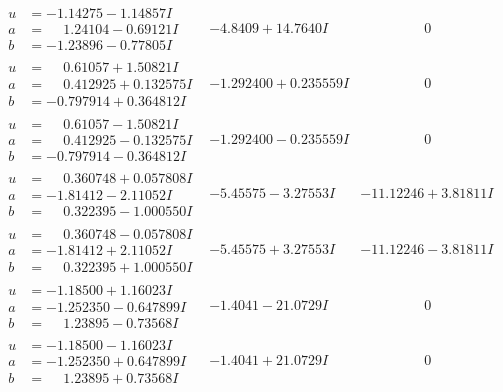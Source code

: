 \documentclass[1p]{elsarticle_modified}
\theoremstyle{definition}
\begin{document}
$$\begin{array}{c|c|c}
\begin{aligned}
u &= -1.14275 - 1.14857 I \\
a &= \phantom{-}1.24104 - 0.69121 I \\
b &= -1.23896 - 0.77805 I\end{aligned}
 & -4.8409 + 14.7640 I & \phantom{-0.000000 } 0 \\ \hline\begin{aligned}
u &= \phantom{-}0.61057 + 1.50821 I \\
a &= \phantom{-}0.412925 + 0.132575 I \\
b &= -0.797914 + 0.364812 I\end{aligned}
 & -1.292400 + 0.235559 I & \phantom{-0.000000 } 0 \\ \hline\begin{aligned}
u &= \phantom{-}0.61057 - 1.50821 I \\
a &= \phantom{-}0.412925 - 0.132575 I \\
b &= -0.797914 - 0.364812 I\end{aligned}
 & -1.292400 - 0.235559 I & \phantom{-0.000000 } 0 \\ \hline\begin{aligned}
u &= \phantom{-}0.360748 + 0.057808 I \\
a &= -1.81412 - 2.11052 I \\
b &= \phantom{-}0.322395 - 1.000550 I\end{aligned}
 & -5.45575 - 3.27553 I & -11.12246 + 3.81811 I \\ \hline\begin{aligned}
u &= \phantom{-}0.360748 - 0.057808 I \\
a &= -1.81412 + 2.11052 I \\
b &= \phantom{-}0.322395 + 1.000550 I\end{aligned}
 & -5.45575 + 3.27553 I & -11.12246 - 3.81811 I \\ \hline\begin{aligned}
u &= -1.18500 + 1.16023 I \\
a &= -1.252350 - 0.647899 I \\
b &= \phantom{-}1.23895 - 0.73568 I\end{aligned}
 & -1.4041 - 21.0729 I & \phantom{-0.000000 } 0 \\ \hline\begin{aligned}
u &= -1.18500 - 1.16023 I \\
a &= -1.252350 + 0.647899 I \\
b &= \phantom{-}1.23895 + 0.73568 I\end{aligned}
 & -1.4041 + 21.0729 I & \phantom{-0.000000 } 0 \\ \hline\begin{aligned}

\end{aligned}
\end{array}$$
\end{document}
